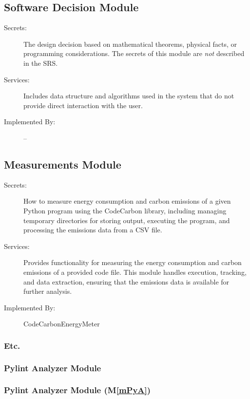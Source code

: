 \documentclass[12pt, titlepage]{article}
\newcommand{\mref}[1]{M\ref{#1}}
\begin{document}
\subsection{Software Decision Module}

\begin{description}
\item[Secrets:] The design decision based on mathematical theorems, physical
  facts, or programming considerations. The secrets of this module are
  \emph{not} described in the SRS.
\item[Services:] Includes data structure and algorithms used in the system that
  do not provide direct interaction with the user. 
\item[Implemented By:] --
\end{description}

\subsection{Measurements Module}

\begin{description}
\item[Secrets:] How to measure energy consumption and carbon emissions of a given Python program using the CodeCarbon library, including managing temporary directories for storing output, executing the program, and processing the emissions data from a CSV file.
\item[Services:] Provides functionality for measuring the energy consumption and carbon emissions of a provided code file. This module handles execution, tracking, and data extraction, ensuring that the emissions data is available for further analysis.
\item[Implemented By:] CodeCarbonEnergyMeter
\end{description}

\subsubsection{Etc.}
\subsubsection{Pylint Analyzer Module}

\subsubsection{Pylint Analyzer Module (\mref{mPyA})}
\end{document}
